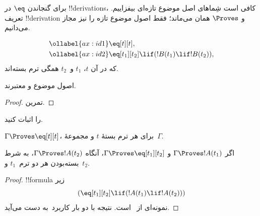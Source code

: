 \documentclass[../../../include/open-logic-section]{subfiles}
\begin{document}


برای گنجاندن $\eq$ در !!{derivation}s، کافی است شِماهای اصل موضوع تازه‌ای
بیفزاییم. تعریف !!{derivation} و $\Proves$ همان می‌ماند؛ فقط اصول موضوع
تازه را نیز مجاز می‌دانیم.

\begin{defn}
\begin{align}
\ollabel{ax:id1} & \eq[t][t], \\
\ollabel{ax:id2} & \eq[t_1][t_2] \lif (!B(t_1) \lif
  !B(t_2)),
\end{align}
که در آن $t$، $t_1$ و~$t_2$ همگی ترم بسته‌اند.
\end{defn}

\begin{prop}
  اصول موضوع  و  معتبرند.
\end{prop}

\begin{proof}
  تمرین.
\end{proof}

\begin{prob}
 را اثبات کنید.
\end{prob}

\begin{prop}
 $\Gamma \Proves \eq[t][t]$، برای هر ترم بستهٔ $t$ و مجموعهٔ~$\Gamma$.
\end{prop}

\begin{prop}
  اگر $\Gamma \Proves !A(t_1)$ و $\Gamma \Proves \eq[t_1][t_2]$، آنگاه
  $\Gamma \Proves !A(t_2)$، به شرط بسته‌بودن هر دو ترم~$t_1$ و~$t_2$.
\end{prop}

\begin{proof}
!!{formula} زیر
\[
(\eq[t_1][t_2] \lif (!A(t_1) \lif !A(t_2)))
\]
نمونه‌ای از~ است. نتیجه با دو بار کاربرد~\MP به دست می‌آید.
\end{proof}
\end{document}
